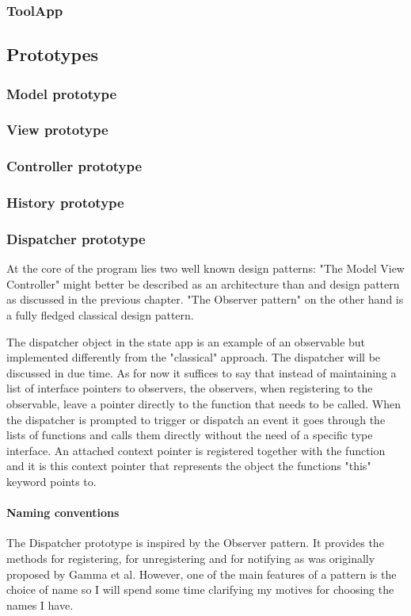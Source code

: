 \documentclass[english]{ifimaster}
\begin{document}
\subsubsection{ToolApp}

\subsection{Prototypes}
\subsubsection{Model prototype}
\subsubsection{View prototype}
\subsubsection{Controller prototype}
\subsubsection{History prototype}



\subsubsection{Dispatcher prototype}
At the core of the program lies two well known design patterns: "The Model View Controller" might better be described as an architecture than and design pattern as discussed in the previous chapter. "The Observer pattern" on the other hand is a fully fledged classical design pattern.

The dispatcher object in the state app is an example of an observable but implemented differently from the "classical" approach. The dispatcher will be discussed in due time. As for now it suffices to say that instead of maintaining a list of interface pointers to observers, the observers, when registering to the observable, leave a pointer directly to the function that needs to be called. When the dispatcher is prompted to trigger or dispatch an event it goes through the lists of functions and calls them directly without the need of a specific type interface. An attached context pointer is registered together with the function and it is this context pointer that represents the object the functions "this" keyword points to.

\paragraph{Naming conventions}
The Dispatcher prototype is inspired by the Observer pattern. It provides the methods for registering, for unregistering and for notifying as was originally proposed by Gamma et al. However, one of the main features of a pattern is the choice of name\parencite[p. 3]{gamma} so I will spend some time clarifying my motives for choosing the names I have. 
\end{document}
